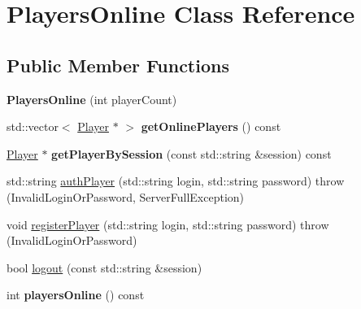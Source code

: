 \hypertarget{class_players_online}{\section{Players\-Online Class Reference}
\label{class_players_online}
}
\subsection*{Public Member Functions}
\begin{DoxyCompactItemize}
\item 
\hypertarget{class_players_online_a8496d232e48655c31e1f74539f11c985}{{\bfseries Players\-Online} (int player\-Count)}\label{class_players_online_a8496d232e48655c31e1f74539f11c985}

\item 
\hypertarget{class_players_online_ab68bbbd25086eb09f875c7773cc784e6}{std\-::vector$<$ \hyperlink{struct_player}{Player} $\ast$ $>$ {\bfseries get\-Online\-Players} () const }\label{class_players_online_ab68bbbd25086eb09f875c7773cc784e6}

\item 
\hypertarget{class_players_online_a12d773bb368cdcb3fb6137fc19805281}{\hyperlink{struct_player}{Player} $\ast$ {\bfseries get\-Player\-By\-Session} (const std\-::string \&session) const }\label{class_players_online_a12d773bb368cdcb3fb6137fc19805281}

\item 
std\-::string \hyperlink{class_players_online_a5b778414970f89fa01e999c9200c7001}{auth\-Player} (std\-::string login, std\-::string password)  throw (\-Invalid\-Login\-Or\-Password, Server\-Full\-Exception)
\item 
void \hyperlink{class_players_online_a26463b293d6c3c38ff600f4b363283cc}{register\-Player} (std\-::string login, std\-::string password)  throw (\-Invalid\-Login\-Or\-Password)
\item 
bool \hyperlink{class_players_online_a3469d271cd5b7ff8f5e7cbab8ff31b6d}{logout} (const std\-::string \&session)
\item 
\hypertarget{class_players_online_acace980a0794f56eecab5ddf01ff51c7}{int {\bfseries players\-Online} () const }\label{class_players_online_acace980a0794f56eecab5ddf01ff51c7}

\end{DoxyCompactItemize}


